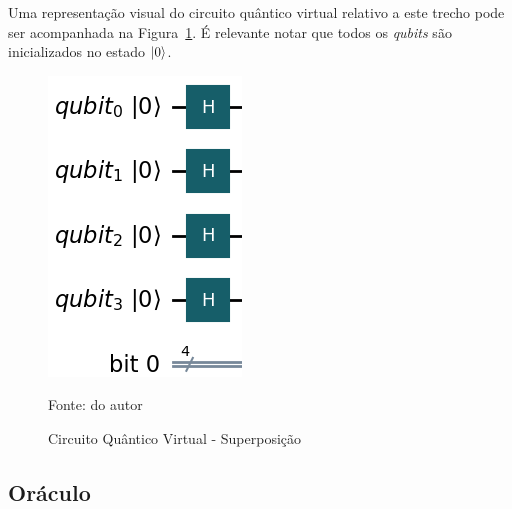 Uma representação visual do circuito quântico virtual relativo a este trecho pode ser acompanhada na Figura~\ref{fig:preparacaoInicial}. É relevante notar que todos os \textit{qubits} são inicializados no estado $\ket{0}$.
%
\begin{figure}[!htb]
    \centering
    \caption{Circuito Quântico Virtual - Superposição}
    \label{fig:preparacaoInicial} 
    
    \includegraphics[scale=0.5]{Imagens/preparacaoInicial.png}

    \vspace{0.3em}
    {\small Fonte: do autor} %
\end{figure}
%
\subsection{Or\'{a}culo}
\label{subSec: oraculoTeo}

